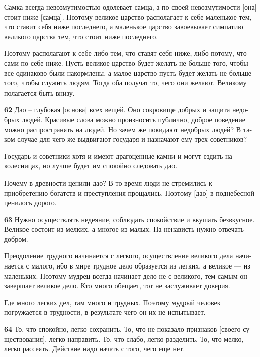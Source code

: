 \documentclass[a4paper]{article}
\begin{document}
{
Самка всегда невозмутимостью одолевает самца, а по своей невозмутимости [она] стоит ниже [самца]. Поэтому великое
царство располагает к себе маленькое тем, что ставит себя ниже последнего, а маленькое царство завоевывает симпатию
великого царства тем, что стоит ниже последнего.}

{
Поэтому располагают к себе либо тем, что ставят себя ниже, либо потому, что сами по себе ниже. Пусть великое царство
будет желать не больше того, чтобы все одинаково были накормлены, а малое царство пусть будет желать не больше того,
чтобы служить людям. Тогда оба получат то, чего они желают. Великому полагается быть внизу.}

{\ttfamily
\foreignlanguage{russian}{\textrm{\textbf{62}}}\foreignlanguage{russian}{\textrm{ Дао – глубокая [основа] всех вещей.
Оно сокровище добрых и защита недобрых людей. Красивые слова можно произносить публично, доброе поведение можно
распространять на людей. Но зачем же покидают недобрых людей? В таком случае для чего же выдвигают государя и назначают
ему трех советников?}}}

{
Государь и советники хотя и имеют драгоценные камни и могут ездить на колесницах, но лучше будет им спокойно следовать
дао.}

{
Почему в древности ценили дао? В то время люди не стремились к приобретению богатств и преступления прощались. Поэтому
[дао] в поднебесной ценилось дорого.}

{\ttfamily
\foreignlanguage{russian}{\textrm{\textbf{63}}}\foreignlanguage{russian}{\textrm{ Нужно осуществлять недеяние, соблюдать
спокойствие и вкушать безвкусное. Великое состоит из мелких, а многое из малых. На ненависть нужно отвечать добром.}}}

{\ttfamily
\foreignlanguage{russian}{\textrm{Преодоление трудного начинается с легкого, осуществление великого дела начинается с
малого, ибо в мире трудное дело образуется из легких, а великое — из маленьких. Поэтому мудрец всегда начинает дело не
с великого, тем самым он завершает великое дело. Кто много обещает, тот не заслуживает
}}\foreignlanguage{russian}{\textrm{доверия.}}}

{
Где много легких дел, там много и трудных. Поэтому мудрый человек погружается в трудности, в результате чего он их не
испытывает.}

{\ttfamily
\foreignlanguage{russian}{\textrm{\textbf{64 }}}\foreignlanguage{russian}{\textrm{То, что спокойно, легко сохранить. То,
что не показало признаков [своего существования], легко направить. То, что слабо, легко разделить. То, что мелко, легко
рассеять. Действие надо начать с того, чего еще нет.}}}
\end{document}
